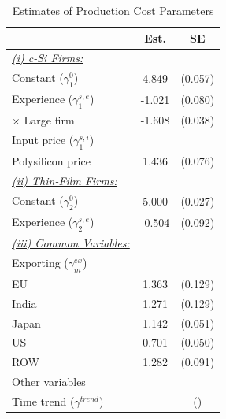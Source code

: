 \documentclass[12pt]{article}
\begin{document}
\begin{table}[!h]
\centering
\caption{Estimates of Production Cost Parameters}
\label{tab:est_dyn_para_1}
\begin{threeparttable}
\begin{tabularx}{0.75\textwidth}{Xcc}
\toprule
 & Est. & SE \\
\midrule
\underline{\textit{(i) c-Si Firms:}} & \\
\quad Constant ($\gamma^{0}_{1}$) & 4.849 & (0.057) \\
\quad Experience ($\gamma^{s,e}_{1}$) & -1.021  & (0.080) \\
\qquad $\times$ Large firm & -1.608 & (0.038) \\
\quad Input price ($\gamma^{s,i}_{1}$) & \\
\qquad Polysilicon price & 1.436 & (0.076) \\
\underline{\textit{(ii) Thin-Film Firms:}} \\
\quad Constant ($\gamma^{0}_{2}$) & 5.000 & (0.027) \\
\quad Experience ($\gamma^{s,e}_{2}$) & -0.504  & (0.092) \\
\underline{\textit{(iii) Common Variables:}} &  \\
\quad Exporting ($\gamma_m^{ex}$) & \\
\qquad EU & 1.363 & (0.129) \\
\qquad India & 1.271 & (0.129) \\
\qquad Japan & 1.142 & (0.051) \\
\qquad US & 0.701 & (0.050) \\
\qquad ROW & 1.282 & (0.091) \\
\quad Other variables &  \\
\qquad Time trend ($\gamma^{trend}$) &  & () \\

\end{tabularx}
\end{threeparttable}
\end{table}
\end{document}
